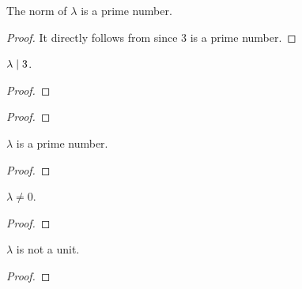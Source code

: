\begin{lemma}
    \label{lmm:norm_lambda_prime}
    \leanok
    The norm of $\lambda$ is a prime number.
\end{lemma}
\begin{proof}
    \leanok
    It directly follows from  since $3$ is a prime number.
\end{proof}

\begin{lemma}
    \label{lmm:lambda_dvd_three}
    \leanok
    $\lambda \mid 3$.
\end{lemma}
\begin{proof}
    \leanok
\end{proof}

\begin{lemma}
    \label{lmm:zeta_sub_one_prime1}
    \leanok
\end{lemma}
\begin{proof}
    \leanok
\end{proof}

\begin{lemma}
    \label{lmm:lambda_prime}
    \leanok
    $\lambda$ is a prime number.
\end{lemma}
\begin{proof}
    \leanok
\end{proof}

\begin{lemma}
    \label{lmm:lambda_ne_zero}
    \leanok
    $\lambda \neq 0$.
\end{lemma}
\begin{proof}
    \leanok
\end{proof}

\begin{lemma}
    \label{lmm:lambda_not_unit}
    \leanok
    $\lambda$ is not a unit.
\end{lemma}
\begin{proof}
    \leanok
\end{proof}

